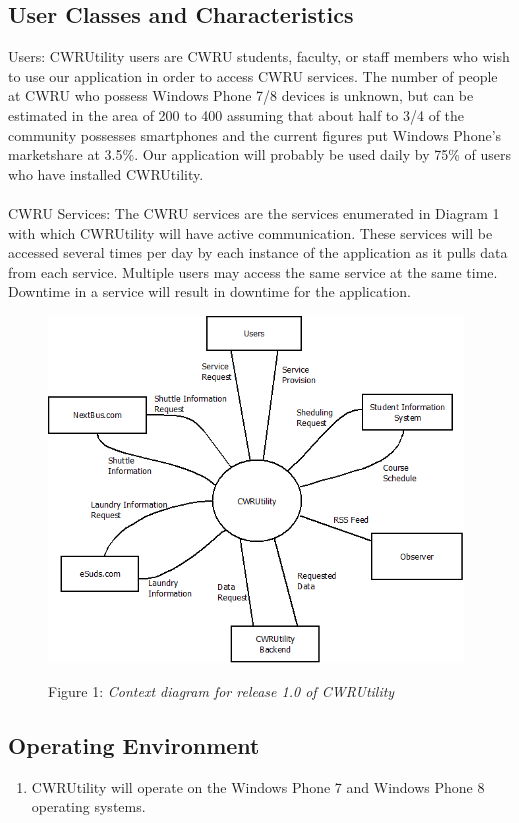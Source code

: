 \documentclass[pdftex,12pt,letter]{article}
\begin{document}
\subsection{User Classes and Characteristics}
\noindent Users: CWRUtility users are CWRU students, faculty, or staff members who wish to use our application in order to access CWRU services. The number of people at CWRU who possess Windows Phone 7/8 devices is unknown, but can be estimated in the area of 200 to 400 assuming that about half to 3/4 of the community possesses smartphones and the current figures put Windows Phone's marketshare at 3.5\%. Our application will probably be used daily by 75\% of users who have installed CWRUtility.\\\\
CWRU Services:  The CWRU services are the services enumerated in Diagram 1 with which CWRUtility will have active communication. These services will be accessed several times per day by each instance of the application as it pulls data from each service. Multiple users may access the same service at the same time. Downtime in a service will result in downtime for the application.
\begin{figure}[h]
\begin{center}
\includegraphics[width=110mm]{ContextDiagram.png}\\
\caption{Figure 1: \emph{Context diagram for release 1.0 of CWRUtility}}
\end{center}
\end{figure}
\subsection{Operating Environment}
\begin{enumerate}[{O}E-1:]
\item CWRUtility will operate on the Windows Phone 7 and Windows Phone 8 operating systems.
\end{enumerate}
\end{document}
